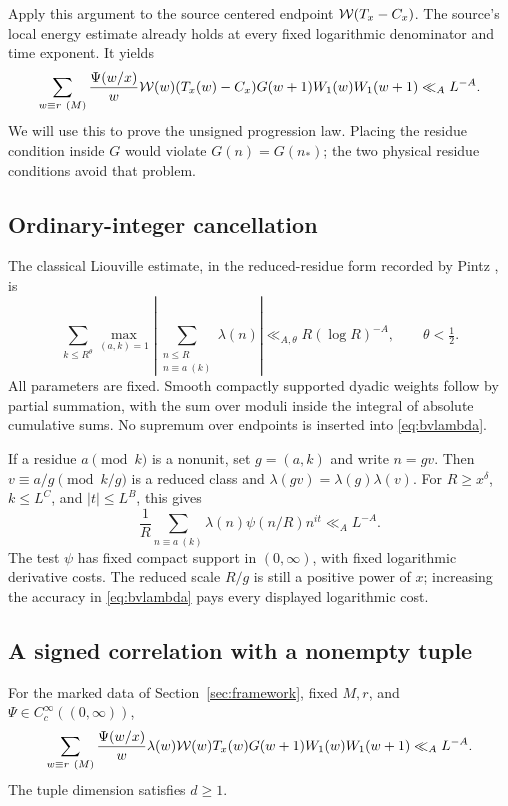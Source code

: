 Apply this argument to the source centered endpoint
$\mathcal W(T_x-C_x)$. The source's local energy estimate already holds at
every fixed logarithmic denominator and time exponent. It yields
\begin{equation}\label{eq:unsigned-correlation}
 \sum_{w\equiv r\ (M)}\frac{\Psi(w/x)}w
 \mathcal W(w)(T_x(w)-C_x)G(w+1)W_1(w)W_1(w+1)\ll_A L^{-A}.
\end{equation}
We will use this to prove the unsigned progression law. Placing the
residue condition inside $G$ would violate $G(n)=G(n_*)$; the two
physical residue conditions avoid that problem.

\subsection{Ordinary-integer cancellation}

The classical Liouville estimate, in the reduced-residue form recorded
by Pintz \cite[equation (1.5)]{Pintz}, is
\begin{equation}\label{eq:bvlambda}
 \sum_{k\leq R^\theta}\max_{(a,k)=1}
 \left|\sum_{\substack{n\leq R\\n\equiv a\ (k)}}\lambda(n)\right|
 \ll_{A,\theta}R(\log R)^{-A},\qquad \theta<\tfrac12.
\end{equation}
All parameters are fixed. Smooth compactly supported dyadic weights
follow by partial summation, with the sum over moduli inside the
integral of absolute cumulative sums. No supremum over endpoints is
inserted into \eqref{eq:bvlambda}.

If a residue $a\pmod k$ is a nonunit, set $g=(a,k)$ and write
$n=gv$. Then $v\equiv a/g\pmod{k/g}$ is a reduced class and
$\lambda(gv)=\lambda(g)\lambda(v)$. For
$R\geq x^\delta$, $k\leq L^C$, and $|t|\leq L^B$, this gives
\begin{equation}\label{eq:swlambda}
 \frac1R\sum_{n\equiv a\ (k)}\lambda(n)\psi(n/R)n^{it}
 \ll_A L^{-A}.
\end{equation}
The test $\psi$ has fixed compact support in $(0,\infty)$, with
fixed logarithmic derivative costs. The reduced scale $R/g$ is still
a positive power of $x$; increasing the accuracy in
\eqref{eq:bvlambda} pays every displayed logarithmic cost.

\subsection{A signed correlation with a nonempty tuple}

\begin{lemma}\label{lem:lambda-correlation}
For the marked data of Section~\ref{sec:framework}, fixed $M,r$, and
$\Psi\in C_c^\infty((0,\infty))$,
\begin{equation}\label{eq:lambda-correlation}
 \sum_{w\equiv r\ (M)}\frac{\Psi(w/x)}w
 \lambda(w)\mathcal W(w)T_x(w)G(w+1)W_1(w)W_1(w+1)
 \ll_A L^{-A}.
\end{equation}
The tuple dimension satisfies $d\geq1$.
\end{lemma}


